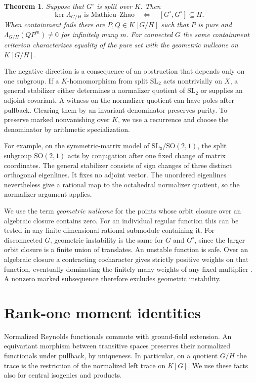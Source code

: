 \documentclass[11pt]{article}
\newtheorem{theorem}{Theorem}[section]
\newcommand{\SL}{\mathrm{SL}}
\newcommand{\SO}{\mathrm{SO}}
\begin{document}
\begin{theorem}\label{thm:main}
Suppose that \(G^\circ\) is split over \(K\). Then
\[
 \ker\Lambda_{G/H}\text{ is Mathieu--Zhao}
 \quad\Longleftrightarrow\quad [G^\circ,G^\circ]\subseteq H .
\]
When containment fails there are \(P,Q\in K[G/H]\) such that \(P\) is
pure and \(\Lambda_{G/H}(QP^m)\ne0\) for infinitely many \(m\). For
connected \(G\) the same containment criterion characterizes equality
of the pure set with the geometric nullcone on \(K[G/H]\).
\end{theorem}

The negative direction is a consequence of an obstruction that depends
only on one subgroup. If a \(K\)-homomorphism from split \(\SL_2\) acts
nontrivially on \(X\), a general stabilizer either determines a
normalizer quotient of \(\SL_2\) or supplies an adjoint covariant.
A witness on the normalizer quotient can have poles after pullback.
Clearing them by an invariant denominator preserves purity. To preserve
marked nonvanishing over \(K\), we use a recurrence and choose the
denominator by arithmetic specialization.

For example, on the symmetric-matrix model of
\(\SL_3/\SO(2,1)\), the split subgroup \(\SO(2,1)\) acts by conjugation
after one fixed change of matrix coordinates. The general stabilizer
consists of sign changes of three distinct orthogonal eigenlines.
It fixes no adjoint vector. The unordered eigenlines nevertheless
give a rational map to the octahedral normalizer quotient, so the
normalizer argument applies.

We use the term \emph{geometric nullcone} for the points whose orbit
closure over an algebraic closure contains zero. For an individual
regular function this can be tested in any finite-dimensional rational
submodule containing it. For disconnected \(G\), geometric instability
is the same for \(G\) and \(G^\circ\), since the larger orbit closure is
a finite union of translates. An unstable function is safe. Over an
algebraic closure a contracting cocharacter gives strictly positive
weights on that function, eventually dominating the finitely many
weights of any fixed multiplier \cite{Kempf,LongSpherical}.
A nonzero marked subsequence therefore excludes geometric instability.

\section{Rank-one moment identities}\label{sec:rank}

Normalized Reynolds functionals commute with ground-field extension.
An equivariant morphism between transitive spaces preserves their
normalized functionals under pullback, by uniqueness. In particular,
on a quotient \(G/H\) the trace is the restriction of the normalized
left trace on \(K[G]\). We use these facts also for central isogenies
and products.
\end{document}
